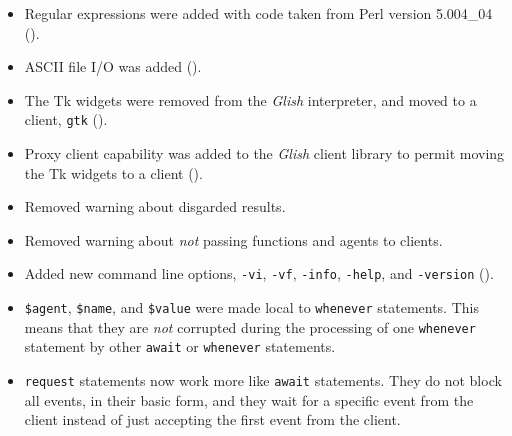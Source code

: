 \begin{itemize}

\item Regular expressions were added with code taken from Perl version 5.004\_04
().

\item ASCII file I/O was added ().

\item The Tk widgets were removed from the {\em Glish} interpreter, and moved
to a client, {\tt gtk} ().

\item Proxy client capability was added to the {\em Glish} client library to
permit moving the Tk widgets to a client ().

\item Removed warning about disgarded results.

\item Removed warning about {\em not} passing functions and agents to clients.

\item Added new command line options, \verb+-vi+, \verb+-vf+, \verb+-info+,
\verb+-help+, and \verb+-version+ ().

\item \verb+$agent+, \verb+$name+, and \verb+$value+ were made local to {\tt whenever}
statements. This means that they are {\em not} corrupted during the processing
of one {\tt whenever} statement by other {\tt await} or {\tt whenever} statements.

\item \verb+request+ statements now work more like {\tt await} statements.
They do not block all events, in their basic form, and they wait for a specific event
from the client instead of just accepting the first event from the client.


\end{itemize}
